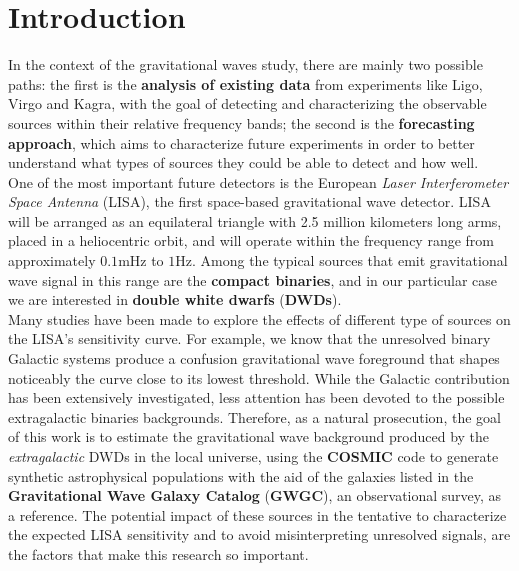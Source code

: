 \chapter*{Introduction}
In the context of the gravitational waves study, there are mainly two possible paths: the first is the \textbf{analysis of existing data} from experiments like Ligo, Virgo and Kagra, with the goal of detecting and characterizing the observable sources within their relative frequency bands;
the second is the \textbf{forecasting approach}, which aims to characterize future experiments in order to better understand what types of sources they could be able to detect and how well.
\vspace{2mm}\\
One of the most important future detectors is the European \textit{Laser Interferometer Space Antenna} (LISA), the first space-based gravitational wave detector. 
LISA will be arranged as an equilateral triangle with 2.5 million kilometers long arms, placed in a heliocentric orbit, and will operate within the frequency range from approximately $0.1\mathrm{mHz}$ to $1\mathrm{Hz}$. 
Among the typical sources that emit gravitational wave signal in this range are the \textbf{compact binaries}, and in our particular case we are interested in \textbf{double white dwarfs} (\textbf{DWDs}).
\vspace{2mm}\\
Many studies have been made to explore the effects of different type of sources on the LISA's sensitivity curve.
For example, we know that the unresolved binary Galactic systems produce a confusion gravitational wave foreground that shapes noticeably the curve close to its lowest threshold.
While the Galactic contribution has been extensively investigated, less attention has been devoted to the possible extragalactic binaries backgrounds.
Therefore, as a natural prosecution, the goal of this work is to estimate the gravitational wave background produced by the \textit{extragalactic} DWDs in the local universe, using the \textbf{COSMIC} code to generate synthetic astrophysical populations with the aid of the galaxies listed in the \textbf{Gravitational Wave Galaxy Catalog} (\textbf{GWGC}), an observational survey, as a reference.
The potential impact of these sources in the tentative to characterize the expected LISA sensitivity and to avoid misinterpreting unresolved signals, are the factors that make this research so important.
\vspace{2mm}
\\  
